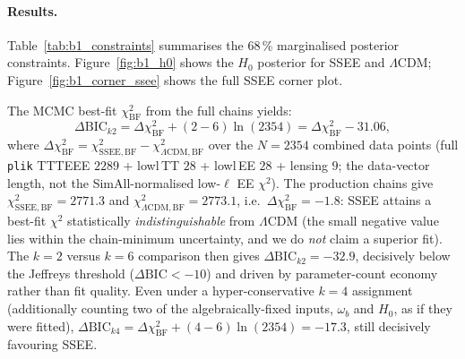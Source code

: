 \documentclass[12pt,a4paper]{article}
\begin{document}
\paragraph{Results.}
Table~\ref{tab:b1_constraints} summarises the 68\,\% marginalised posterior constraints. Figure~\ref{fig:b1_h0} shows the $H_0$ posterior for SSEE and $\Lambda$CDM; Figure~\ref{fig:b1_corner_ssee} shows the full SSEE corner plot.

The MCMC best-fit $\chi^2_\mathrm{BF}$ from the full chains yields:
\begin{equation}
    \label{eq:bic_b1_result}
    \Delta\mathrm{BIC}_{k2} = \Delta\chi^2_\mathrm{BF} + (2-6)\ln(2354)
    = \Delta\chi^2_\mathrm{BF} - 31.06,
\end{equation}
where $\Delta\chi^2_\mathrm{BF} = \chi^2_{\mathrm{SSEE,BF}} - \chi^2_{\Lambda\mathrm{CDM,BF}}$ over the $N=2354$ combined data points (full \texttt{plik} TTTEEE $2289$ + lowl\,TT $28$ + lowl\,EE $28$ + lensing $9$; the data-vector length, not the SimAll-normalised low-$\ell$ EE $\chi^2$). The production chains give $\chi^2_{\mathrm{SSEE,BF}}=2771.3$ and $\chi^2_{\Lambda\mathrm{CDM,BF}}=2773.1$, i.e.\ $\Delta\chi^2_\mathrm{BF}=-1.8$: SSEE attains a best-fit $\chi^2$ statistically \emph{indistinguishable} from $\Lambda$CDM (the small negative value lies within the chain-minimum uncertainty, and we do \emph{not} claim a superior fit). The $k=2$ versus $k=6$ comparison then gives $\Delta\mathrm{BIC}_{k2}=-32.9$, decisively below the Jeffreys threshold ($\Delta\mathrm{BIC}<-10$) and driven by parameter-count economy rather than fit quality. Even under a hyper-conservative $k=4$ assignment (additionally counting two of the algebraically-fixed inputs, $\omega_b$ and $H_0$, as if they were fitted), $\Delta\mathrm{BIC}_{k4}=\Delta\chi^2_\mathrm{BF}+(4-6)\ln(2354)=-17.3$, still decisively favouring SSEE.
\end{document}
